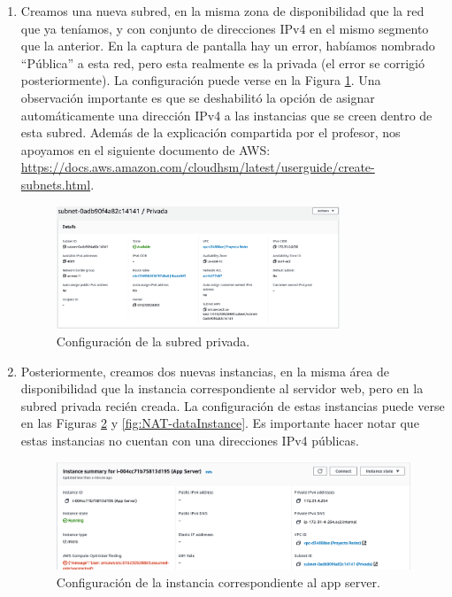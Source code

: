 \documentclass{article}
\begin{document}
\begin{enumerate}
  \item Creamos una nueva subred, en la misma zona de
    disponibilidad que la red que ya ten\'iamos, y con
    conjunto de direcciones IPv4 en el mismo segmento
    que la anterior.   En la captura de pantalla hay un
    error, hab\'iamos nombrado ``P\'ublica'' a esta red,
    pero esta realmente es la privada (el error se
    corrigi\'o posteriormente).    La configuraci\'on
    puede verse en la Figura \ref{fig:NAT-priSubnet}. Una
    observaci\'on importante es que se deshabilit\'o
    la opci\'on de asignar autom\'aticamente una
    direcci\'on IPv4 a las instancias que se creen
    dentro de esta subred.   Adem\'as de la explicaci\'on
    compartida por el profesor, nos apoyamos en el
    siguiente documento de AWS: \href{https://docs.aws.amazon.com/cloudhsm/latest/userguide/create-subnets.html}{https://docs.aws.amazon.com/cloudhsm/latest/userguide/create-subnets.html}.
    \begin{figure}[H]
      \centering
      \includegraphics[width=0.8\textwidth]{NAT/privateSubnet}
      \caption{Configuraci\'on de la subred privada.}
      \label{fig:NAT-priSubnet}
    \end{figure}

  \item Posteriormente, creamos dos nuevas instancias,
    en la misma \'area de disponibilidad que la instancia
    correspondiente al servidor web, pero en la subred
    privada reci\'en creada. La configuraci\'on de estas
    instancias puede verse en las Figuras
    \ref{fig:NAT-appInstance} y \ref{fig:NAT-dataInstance}.
    Es importante hacer notar que estas instancias no cuentan
    con una direcciones IPv4 p\'ublicas.
    \begin{figure}[H]
      \centering
      \includegraphics[width=\textwidth]{NAT/appInstance}
      \caption{Configuraci\'on de la instancia correspondiente
               al app server.}
      \label{fig:NAT-appInstance}
    \end{figure}


\end{enumerate}
\end{document}
